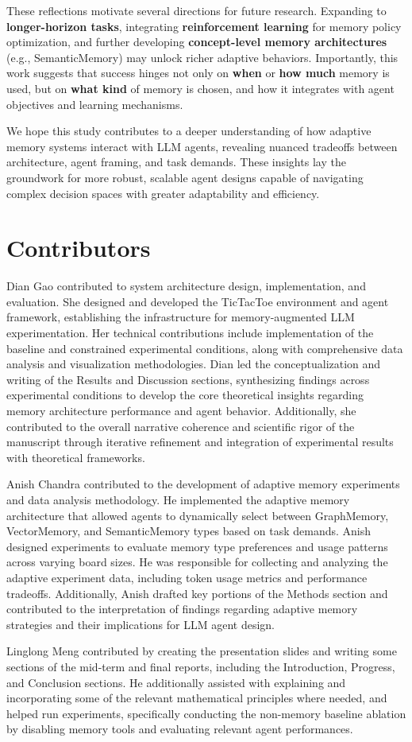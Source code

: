 \documentclass[10pt]{article}
\begin{document}
These reflections motivate several directions for future research. Expanding to \textbf{longer-horizon tasks}, integrating \textbf{reinforcement learning} for memory policy optimization, and further developing \textbf{concept-level memory architectures} (e.g., SemanticMemory) may unlock richer adaptive behaviors. Importantly, this work suggests that success hinges not only on \textbf{when} or \textbf{how much} memory is used, but on \textbf{what kind} of memory is chosen, and how it integrates with agent objectives and learning mechanisms.

We hope this study contributes to a deeper understanding of how adaptive memory systems interact with LLM agents, revealing nuanced tradeoffs between architecture, agent framing, and task demands. These insights lay the groundwork for more robust, scalable agent designs capable of navigating complex decision spaces with greater adaptability and efficiency.

\section{Contributors}
Dian Gao contributed to system architecture design, implementation, and evaluation. She designed and developed the TicTacToe environment and agent framework, establishing the infrastructure for memory-augmented LLM experimentation. Her technical contributions include implementation of the baseline and constrained experimental conditions, along with comprehensive data analysis and visualization methodologies. Dian led the conceptualization and writing of the Results and Discussion sections, synthesizing findings across experimental conditions to develop the core theoretical insights regarding memory architecture performance and agent behavior. Additionally, she contributed to the overall narrative coherence and scientific rigor of the manuscript through iterative refinement and integration of experimental results with theoretical frameworks.

Anish Chandra contributed to the development of adaptive memory experiments and data analysis methodology. He implemented the adaptive memory architecture that allowed agents to dynamically select between GraphMemory, VectorMemory, and SemanticMemory types based on task demands. Anish designed experiments to evaluate memory type preferences and usage patterns across varying board sizes. He was responsible for collecting and analyzing the adaptive experiment data, including token usage metrics and performance tradeoffs. Additionally, Anish drafted key portions of the Methods section and contributed to the interpretation of findings regarding adaptive memory strategies and their implications for LLM agent design.

Linglong Meng contributed by creating the presentation slides and writing some sections of the mid-term and final reports, including the Introduction, Progress, and Conclusion sections. He additionally assisted with explaining and incorporating some of the relevant mathematical principles where needed, and helped run experiments, specifically conducting the non-memory baseline ablation by disabling memory tools and evaluating relevant agent performances.


\end{document}
